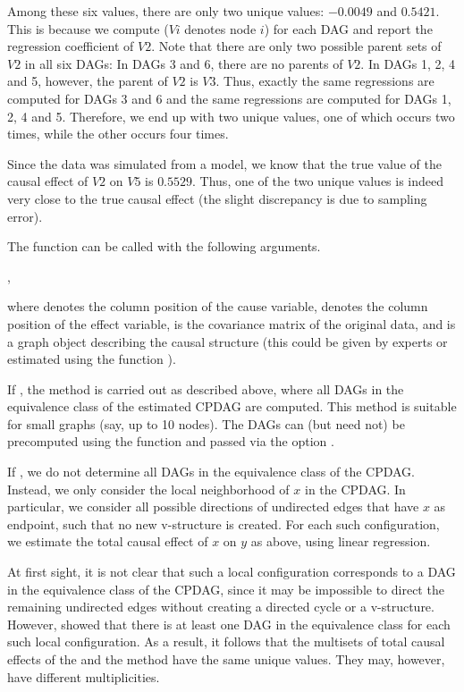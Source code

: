 \documentclass[article]{jss}
\begin{document}
Among these six values, there are only two unique values: $-0.0049$ and
$0.5421$. This is because we compute  ($Vi$
denotes node $i$) for each
DAG and report the regression coefficient of $V2$. Note that there are
only two possible parent sets of $V2$ in all six DAGs: In DAGs 3 and 6,
there are no parents of $V2$. In DAGs 1, 2, 4 and 5, however, the parent
of $V2$ is $V3$. Thus, exactly the same regressions are computed for
DAGs 3 and 6 and the same regressions are computed for DAGs 1, 2, 4 and
5. Therefore, we end up with two unique values, one of which occurs two
times, while the other occurs four times.

Since the data was simulated from a model, we know that the true value of the
causal effect of $V2$ on $V5$ is $0.5529$. Thus, one of the two unique values is
indeed very close to the true causal effect (the slight discrepancy is due
to sampling error). 

The function  can be called with the following arguments.

,

where  denotes the column position of the cause variable, 
 denotes the column position of the effect
variable,  is the covariance matrix of the original
data, and  is a graph object describing the causal structure
(this could be given by experts or estimated using the function ).

If , the method is carried out as described above,
where all DAGs in the equivalence class of the estimated CPDAG are
computed. This method is suitable for small graphs (say, up to 10
nodes). The DAGs can (but need not) be precomputed using the function
 and passed via the option .

If , we do not determine all DAGs in the equivalence
class of the CPDAG. Instead, we only consider the local neighborhood of $x$
in the CPDAG. In particular, we consider all possible directions of
undirected edges that have $x$ as endpoint, such that no new v-structure is
created. For each such configuration, we estimate the total causal effect
of $x$ on $y$ as above, using linear regression.

At first sight, it is not clear that such a local configuration corresponds
to a DAG in the equivalence class of the CPDAG, since it may be impossible
to direct the remaining undirected edges without creating a directed cycle
or a v-structure. However, \cite{BuKaMa10} showed
that there is at least one DAG in the equivalence class for each such local
configuration.  As a result, it follows that the multisets of total causal
effects of the  and the  method have the same unique
values. They may, however, have different multiplicities. 
\end{document}
